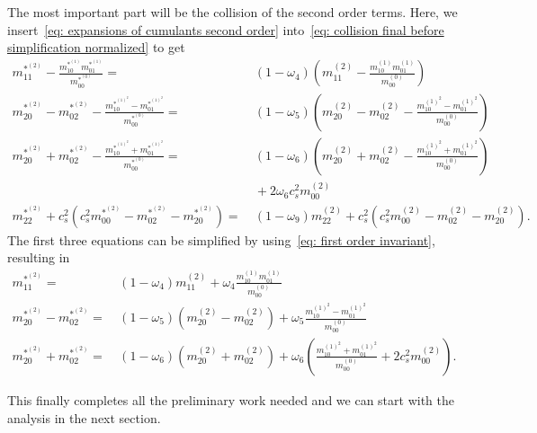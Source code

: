 The most important part will be the collision of the second order terms.
Here, we insert~\eqref{eq: expansions of cumulants second order} into~\eqref{eq: collision final before simplification normalized} to get
\begin{align}
  \label{eq: collide moments 11_2 raw}
  m_{11}^{*^{(2)}} - \frac{ m_{10}^{*^{(1)}}m_{01}^{*^{(1)}}}{m_{00}^{*^{(0)}}} =&\ (1-\omega_4)\left(m_{11}^{(2)} - \frac{ m_{10}^{(1)}m_{01}^{(1)}}{m_{00}^{(0)}}\right)
  \\
  \label{eq: collide moments 20m02_2 raw}
  m_{20}^{*^{(2)}}-m_{02}^{*^{(2)}} - \frac{ m_{10}^{*^{{(1)}^2}} - m_{01}^{*^{{(1)}^2}}}{m_{00}^{*^{(0)}}} =&\ (1-\omega_5) \left(m_{20}^{(2)}-m_{02}^{(2)} - \frac{ m_{10}^{{(1)}^2} - m_{01}^{{(1)}^2}}{m_{00}^{(0)}}\right)
  \\
  \label{eq: collide moments 20p02_2 raw}
  m_{20}^{*^{(2)}}+m_{02}^{*^{(2)}} - \frac{ m_{10}^{*^{{(1)}^2}} + m_{01}^{*^{{(1)}^2}}}{m_{00}^{*^{(0)}}}
  =&\ (1-\omega_6)\left(  m_{20}^{(2)}+m_{02}^{(2)} - \frac{ m_{10}^{{(1)}^2} + m_{01}^{{(1)}^2}}{m_{00}^{(0)}}\right)
  \\\nonumber&\ + 2\omega_6 c_s^2 m_{00}^{(2)}
  \\
  \label{eq: collide moments 22_2 raw}
  m_{22}^{*^{(2)}}
  + c_s^2\left(c_s^2 m_{00}^{*^{(2)}}
  - m_{02}^{*^{(2)}}
  - m_{20}^{*^{(2)}} \right)
  =&\ (1-\omega_9)m_{22}^{(2)}
  + c_s^2\left(c_s^2 m_{00}^{(2)}
  - m_{02}^{(2)}
  - m_{20}^{(2)}    \right).
\end{align}
The first three equations can be simplified by using~\eqref{eq: first order invariant}, resulting in
\begin{align}
  \label{eq: collide moments 11_2}
  m_{11}^{*^{(2)}}  =&\ (1-\omega_4)m_{11}^{(2)} + \omega_4 \frac{ m_{10}^{(1)}m_{01}^{(1)}}{m_{00}^{(0)}}
  \\
  \label{eq: collide moments 20m02_2}
  m_{20}^{*^{(2)}}-m_{02}^{*^{(2)}} =&\ (1-\omega_5) \left(m_{20}^{(2)}-m_{02}^{(2)}\right) + \omega_5 \frac{ m_{10}^{{(1)}^2} - m_{01}^{{(1)}^2}}{m_{00}^{(0)}}
  \\
  \label{eq: collide moments 20p02_2}
  m_{20}^{*^{(2)}}+m_{02}^{*^{(2)}}
  =&\ (1-\omega_6)\left(  m_{20}^{(2)} + m_{02}^{(2)}\right)
  + \omega_6 \left( \frac{ m_{10}^{{(1)}^2} + m_{01}^{{(1)}^2}}{m_{00}^{(0)}}
  + 2 c_s^2 m_{00}^{(2)} \right).
\end{align}


This finally completes all the preliminary work needed and we can start with the analysis in the next section.
